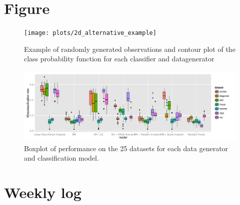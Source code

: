 \section{Figure}
\begin{figure}[H]
	\centering
	\texttt{[image: plots/2d\_alternative\_example]}
	\caption{Example of randomly generated observations and contour plot of the class probability function for each classifier and datagenerator}
	\label{fig:example-models}
\end{figure}

\begin{figure}[H]
	\centering
	\includegraphics[width=1.0\textwidth]{plots/2d_alternative_boxplot}
	\caption{Boxplot of performance on the 25 datasets for each data generator and classification model.}
	\label{fig:boxplot}
\end{figure}

\twocolumn
\section{Weekly log}










